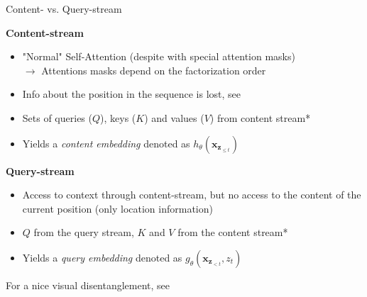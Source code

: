 \begin{frame}{Content- vs. Query-stream}

	\textbf{Content-stream}
	
	\begin{itemize}
		\item "Normal" Self-Attention (despite with special attention masks)\\
					$\rightarrow$ Attentions masks depend on the factorization order
		\item Info about the position in the sequence is lost, see \href{https://arxiv.org/pdf/1906.08237.pdf}{}
		\item Sets of queries ($Q$), keys ($K$) and values ($V$) from content stream*
		\item Yields a \textit{content embedding} denoted as $h_{\theta}(\mathbf{x}_{\mathbf{z}_{\leq t}})$
	\end{itemize}

	\vspace{.3cm}
	
	\textbf{Query-stream}
	
	\begin{itemize}
		\item Access to context through content-stream, but no access to the content of the current position (only location information)
		\item $Q$ from the query stream, $K$ and $V$ from the content stream*
		\item Yields a \textit{query embedding} denoted as $g_{\theta}(\mathbf{x}_{\mathbf{z}_{< t}}, z_t)$
	\end{itemize}

	\vspace{.3cm}
	
	{\footnotesize *For a nice visual disentanglement, see \href{https://arxiv.org/pdf/1906.08237.pdf}{}}
\end{frame}


